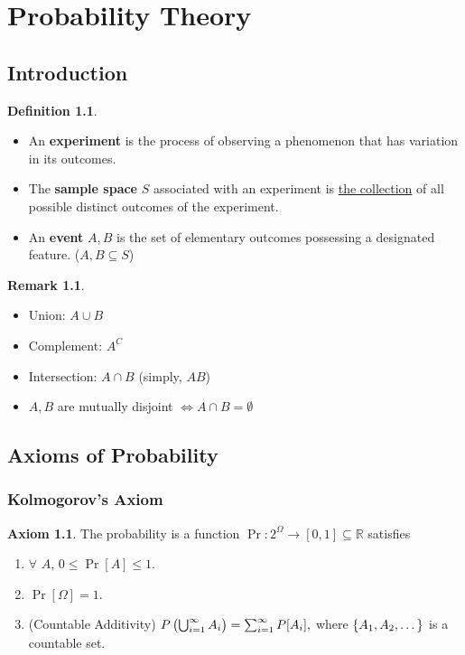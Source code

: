 \documentclass[12pt,openany]{book}
\theoremstyle{definition}
\newtheorem{definition}{Definition}[chapter]
\newtheorem{remark}{Remark}[chapter]
\newtheorem*{axiom}{Axiom}
\newcommand{\R}{\mathbb{R}}
\begin{document}
	\newpage
	\chapter{Probability Theory}
	
	\section{Introduction}
	
	\begin{tcolorbox}[colback=white,colframe=defcolor,arc=5pt,title={\color{white}\bf }]
		\begin{definition}
			\ \begin{itemize}
				\item An \textbf{experiment} is the process of observing a phenomenon that has variation in its outcomes.
				\item The \textbf{sample space} $S$ associated with an experiment is \underline{the collection} of all
				possible distinct outcomes of the experiment.
				\item An \textbf{event} $A, B$ is the set of elementary outcomes possessing a designated feature. ($A,B\subseteq S$)
			\end{itemize}
		\end{definition}
	\end{tcolorbox}
	\begin{remark}
		\ \begin{itemize}
			\item Union: $A\cup B$
			\item Complement: $A^C$
			\item Intersection: $A\cap B$ (simply, $AB$)
			\item $A,B$ are mutually disjoint $\iff A\cap B=\emptyset$
		\end{itemize}
	\end{remark}
	
	\newpage
	\section{Axioms of Probability}
	\subsection{Kolmogorov's Axiom}
	\begin{tcolorbox}[colback=white,colframe=magenta,arc=5pt,title={\color{white}\bf Kolmogorov's Axiom}]
		\begin{axiom}
			The probability is a function $\Pr:2^\Omega\to[0,1]\subseteq\R$ satisfies
			\begin{enumerate}[(\text{A}1)]
				\item $\forall$ $A$, $0\leq\Pr[A]\leq 1$.
				\item $\Pr[\Omega]=1$.
				\item (Countable Additivity) $
				P\del{\bigcup_{i=1}^\infty A_i}=\sum_{i=1}^\infty P[A_i],
				$ where $\set{A_1,A_2,\dots}$ is a countable set.
			\end{enumerate}
		\end{axiom}
	\end{tcolorbox}
\end{document}
